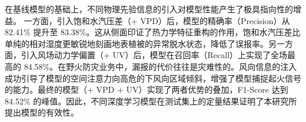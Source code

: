 在基线模型的基础上，不同物理先验信息的引入对模型性能产生了极具指向性的增益。
一方面，引入饱和水汽压差（+ VPD）后，模型的精确率（Precision）从 82.41\% 提升至 83.38\%。这从侧面印证了热力学特征重构的作用，饱和水汽压差比单纯的相对湿度更敏锐地刻画地表植被的异常脱水状态，降低了误报率。另一方面，引入风场动力学偏置（+ UV）后，模型在召回率（Recall）上实现了全场最高的 84.58\%。在野火防灾业务中，漏报的代价往往是灾难性的。风向信息的注入成功引导了模型的空间注意力向高危的下风向区域倾斜，增强了模型捕捉起火信号的能力。最终的模型（+ VPD + UV）实现了两者优势的叠加，F1-Score 达到 84.52\% 的峰值。因此，不同深度学习模型在测试集上的定量结果证明了本研究所提出模型的有效性。


